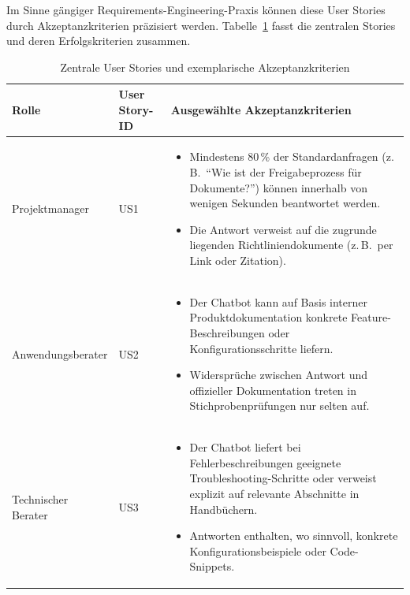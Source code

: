 Im Sinne gängiger Requirements-Engineering-Praxis können diese User Stories durch Akzeptanzkriterien präzisiert werden.
Tabelle~\ref{tab:user-stories-akzeptanzkriterien} fasst die zentralen Stories und deren Erfolgskriterien zusammen.
\vspace{1cm}
\FloatBarrier
\begin{table}[htbp]
    \centering
    \small
    \begin{tabular}{p{2.5cm}p{3cm}p{7.5cm}}
        \toprule
        \textbf{Rolle} & \textbf{User Story-ID} & \textbf{Ausgewählte Akzeptanzkriterien} \\
        \midrule
        Projektmanager & US1 &
        \begin{itemize}[leftmargin=*]
            \item Mindestens 80\,\% der Standardanfragen (z.\,B.\ \enquote{Wie ist der Freigabeprozess für Dokumente?}) können innerhalb von wenigen Sekunden beantwortet werden.
            \item Die Antwort verweist auf die zugrunde liegenden Richtliniendokumente (z.\,B.\ per Link oder Zitation).
        \end{itemize} \\
        \addlinespace
        Anwendungsberater & US2 &
        \begin{itemize}[leftmargin=*]
            \item Der Chatbot kann auf Basis interner Produktdokumentation konkrete Feature-Beschreibungen oder Konfigurationsschritte liefern.
            \item Widersprüche zwischen Antwort und offizieller Dokumentation treten in Stichprobenprüfungen nur selten auf.
        \end{itemize} \\
        \addlinespace
        Technischer Berater & US3 &
        \begin{itemize}[leftmargin=*]
            \item Der Chatbot liefert bei Fehlerbeschreibungen geeignete Troubleshooting-Schritte oder verweist explizit auf relevante Abschnitte in Handbüchern.
            \item Antworten enthalten, wo sinnvoll, konkrete Konfigurationsbeispiele oder Code-Snippets.
        \end{itemize} \\
        \bottomrule
    \end{tabular}
    \caption{Zentrale User Stories und exemplarische Akzeptanzkriterien}
    \label{tab:user-stories-akzeptanzkriterien}
\end{table}
\vspace{1cm}
\FloatBarrier
